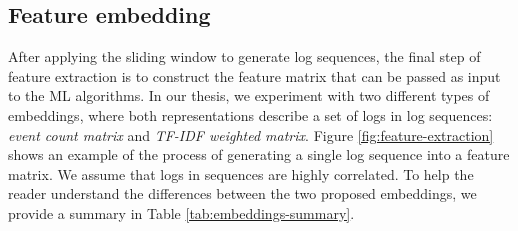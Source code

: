 \subsection{Feature embedding}
\label{subsection:features}
After applying the sliding window to generate log sequences, the final step of feature extraction is to construct the feature matrix that can be passed as input to the ML algorithms. In our thesis, we experiment with two different types of embeddings, where both representations describe a set of logs in log sequences: \textit{event count matrix} and \textit{TF-IDF weighted matrix}. Figure \ref{fig:feature-extraction} shows an example of the process of generating a single log sequence into a feature matrix. We assume that logs in sequences are highly correlated. To help the reader understand the differences between the two proposed embeddings, we provide a summary in Table \ref{tab:embeddings-summary}.

\begin{figure}[!h] 
\end{figure}

\begin{table}
\centering
{}
\caption{A summary of feature matrix types using in our thesis }\label{tab:embeddings-summary}
\end{table}

